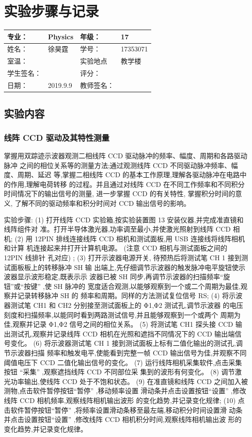 \documentclass{ctexart}
\begin{document}
\newpage
\section{实验步骤与记录}
\begin{tabular}{|p{8em}|p{8em}|p{8em}|p{8em}|}
	\hline 
	专业：     &Physics       &年级：      & 17     \\
	\hline
	姓名：& 徐昊霆 &学号：&17353071  \\
	\hline
	室温：&                    &实验地点 & 教学楼 \\
	\hline	
	学生签名： & & 评分： & \\
	\hline
	日期： & 2019.9.9 & 教师签名：&  \\
	\hline
\end{tabular}
\subsection{实验内容}
\subsubsection{线阵 CCD 驱动及其特性测量}
掌握用双踪迹示波器观测二相线阵 CCD 驱动脉冲的频率、幅度、周期和各路驱动脉冲
之间的相位关系等的测量方法;通过观测线阵 CCD 不同驱动脉冲频率、幅度、周期、延迟
等,掌握二相线阵 CCD 的基本工作原理,理解各驱动脉冲在电路中的作用,理解电荷转移
的过程。并且通过对线阵 CCD 在不同工作频率和不同积分时间情况下的输出信号的测量,
进一步掌握 CCD 的有关特性,
掌握积分时间的意义,
了解不同的驱动频率和积分时间对 CCD
输出信号的影响。

实验步骤:
(1) 打开线阵 CCD 实验箱,按实验装置图 13 安装仪器,并完成准直镜和线阵组件对
准。打开半导体激光器,功率调至最小,并使激光照射到线阵 CCD 相机;
(2) 用 12PIN 排线连接线阵 CCD 相机和测试面板,用 USB 连接线将线阵相机和计算
机连接起来并打开计算机电源。
(注意 CCD 相机与测试面板之间的 12PIN 线排针
孔对应)
;
(3) 打开示波器电源开关,
待预热后将测试笔 CH 1 接到测试面板板上的转移脉冲 SH 输
出端上,先仔细调节示波器的触发脉冲电平旋钮使示波器显示波形稳定,既表示示
波器已被 SH 同步,再调节示波器的扫描频率“旋钮”或“按键”
,使 SH 脉冲的
宽度适合观测,以能够观察到一个或二个周期为最佳,观察并记录转移脉冲 SH 的
频率和周期。同样的方法测试复位信号 RS;
(4) 将示波器测试笔 CH1 和 CH2 分别接至测试面板上的 Φ1,Φ2 测试孔,调节示波器
的电压刻度和扫描频率,以能同时看到两路测试信号,并且能够观察到一个或两个
周期为佳,观察并记录 Φ1,Φ2 信号之间的相位关系。
(5) 将测试笔 CH1 探头接 CCD 输出测试孔,观察并记录线阵 CCD 相机在光照和遮挡不同情况下的 CCD 输出端信号变化。
(6) 将示波器测试笔 CH 1 接到测试面板上标有二值化输出的测试孔,调节示波器扫描
频率和触发电平,使能看到完整一帧 CCD 输出信号为佳,并观察不同阈值电压下
CCD 二值化输出信号的变化。
(7) 运行线阵相机采集软件,点击采集按钮 “采集”
,观察遮挡线阵 CCD 不同部位采
集到的波形有何变化。
(8) 调节激光功率输出,使线阵 CCD 处于不饱和状态。
(9) 在准直镜和线阵 CCD 之间加入被测物,点击软件暂停按钮“暂停”
,移动频率设置
滑动条并点击设置按钮“设置”
,修改线阵 CCD 相机频率,观察线阵相机输出波形
的变化趋势,并记录变化规律;
(10) 点击软件暂停按钮“暂停”
,将频率设置滑动条移至最左端,移动积分时间设置滑
动条并点击设置按钮“设置”
,修改线阵 CCD 相机积分时间,观察线阵相机输出波
形的变化趋势,并记录变化规律。
\end{document}
